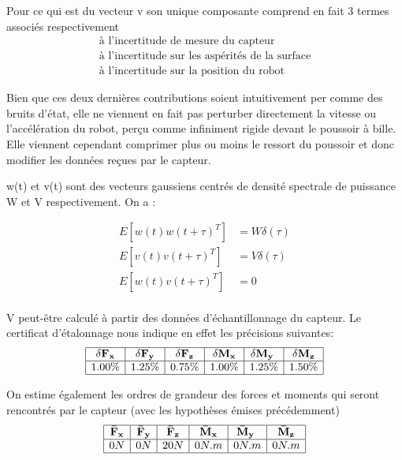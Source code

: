 \documentclass[12pt,twoside,a4paper]{article}
\begin{document}
 Pour ce qui est du vecteur v son unique composante comprend en fait 3 termes associés respectivement 
 $$
 \begin{array}{l}
 	\text{à l'incertitude de mesure du capteur} \\
	\text{à l'incertitude sur les aspérités de la surface} \\
	\text{à l'incertitude sur la position du robot}
 \end{array}
 $$
 
 Bien que ces deux dernières contributions soient intuitivement per comme des bruits d'état, elle ne viennent en fait pas perturber directement la vitesse ou l'accélération du robot, perçu comme infiniment rigide devant le poussoir à bille. Elle viennent cependant comprimer plus ou moins le ressort du poussoir et donc modifier les données reçues par le capteur. \\
 
 \vspace{0.5cm}


w(t) et v(t) sont des vecteurs gaussiens centrés de densité spectrale de puissance W et V respectivement. On a :

$$
\begin{array}{ll}
E[w(t) w(t+\tau)^T ] &= W \delta(\tau) \\
E[v(t) v(t+\tau)^T ] &= V \delta(\tau)  \\
E[w(t) v(t+\tau)^T ] &= 0  \\
\end{array}
$$

\vspace{1cm}

V peut-être calculé à partir des données d'échantillonnage du capteur. Le certificat d'étalonnage nous indique en effet les précisions suivantes:
$$
\begin{array}{|c|c|c|c|c|c|}	
	\hline
	\bold{\delta F_x} & \bold{\delta F_y} & \bold{\delta F_z} & \bold{\delta M_x} & \bold{\delta M_y} & \bold{\delta M_z} \\
	\hline 
	1.00\% & 1.25\% & 0.75\% & 1.00\% & 1.25\% & 1.50\% \\
	\hline
\end{array}
$$

On estime également les ordres de grandeur des forces et moments qui seront rencontrés par le capteur (avec les hypothèses émises précédemment)
$$
\begin{array}{|c|c|c|c|c|c|}	
	\hline
	\bold{\bar{F}_x} & \bold{\bar{F}_y} & \bold{\bar{F}_z} & \bold{\bar{M}_x} & \bold{\bar{M}_y} & \bold{\bar{M}_z} \\
	\hline 
	0N & 0N & 20N & 0N.m & 0N.m & 0N.m \\
	\hline
\end{array}
$$
\end{document}
